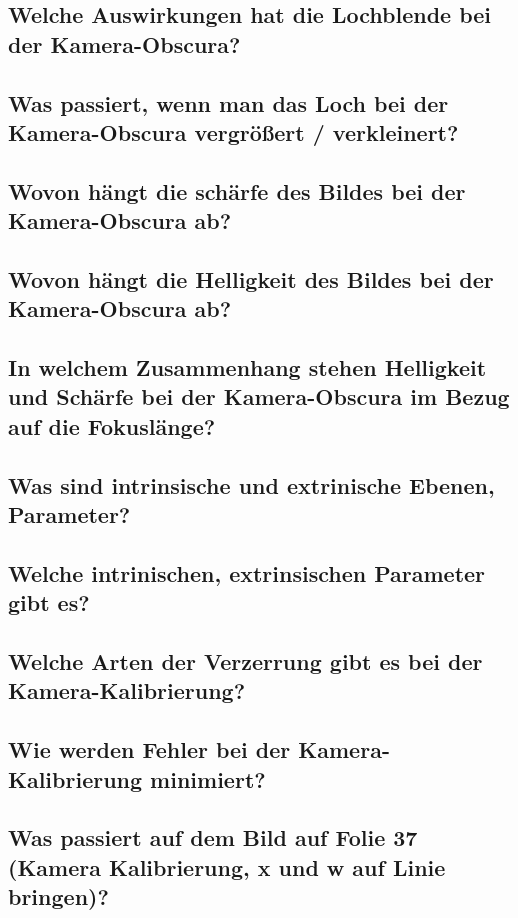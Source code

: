 \subsection{Welche Auswirkungen hat die Lochblende bei der Kamera-Obscura?}

\subsection{Was passiert, wenn man das Loch bei der Kamera-Obscura vergrößert / verkleinert?}

\subsection{Wovon hängt die schärfe des Bildes bei der Kamera-Obscura ab?}

\subsection{Wovon hängt die Helligkeit des Bildes bei der Kamera-Obscura ab?}

\subsection{In welchem Zusammenhang stehen Helligkeit und Schärfe bei der Kamera-Obscura im Bezug auf die Fokuslänge?}

\subsection{Was sind intrinsische und extrinische Ebenen, Parameter?}

\subsection{Welche intrinischen, extrinsischen Parameter gibt es?}

\subsection{Welche Arten der Verzerrung gibt es bei der Kamera-Kalibrierung?}

\subsection{Wie werden Fehler bei der Kamera-Kalibrierung minimiert?}

\subsection{Was passiert auf dem Bild auf Folie 37 (Kamera Kalibrierung, x und w auf Linie bringen)?}

